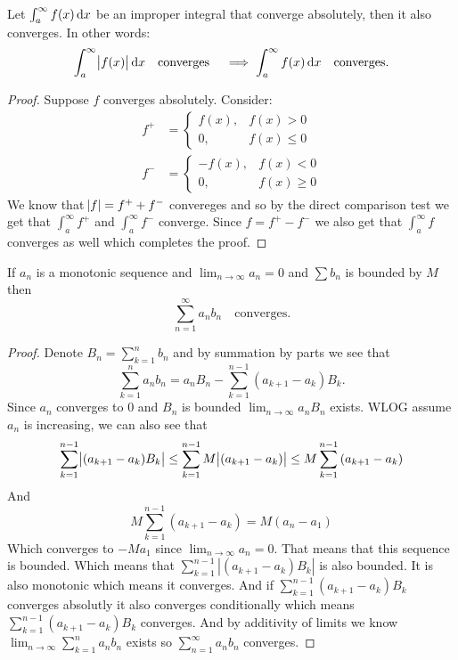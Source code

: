 \documentclass[11pt,a4paper]{article}
\begin{document}
  \begin{proposition}
    Let $\int_a^\infty f(x)\dx$ be an improper integral that 
    converge absolutely, then it also converges.
    In other words:
    \[
      \int_a^\infty \abs{f(x)}\dx \quad\mathrm{converges}\quad
      \implies
      \int_a^\infty {f(x)}\dx \quad\mathrm{converges}.
    \]
  \end{proposition}
  \begin{proof}
    Suppose $f$ converges absolutely. Consider:
    \begin{align*}
      f^+&=
      \begin{cases}
          f(x),  & f(x) > 0 \\
          0,  & f(x) \le 0
      \end{cases} \\
      f^-&=
      \begin{cases}
          -f(x),  & f(x) < 0 \\
          0,  & f(x) \ge 0
      \end{cases}
    \end{align*}
    We know that $\abs{f} = f^+ + f^-$ convereges and so by the direct 
    comparison test we get that  $\int_{a}^{\infty} f^+$ and 
    $\int_{a}^{\infty} f^-$ converge.
    Since $f = f^+ - f^-$ we also get that $\int_{a}^{\infty} f$ converges 
    as well which completes the proof.
  \end{proof}

  \begin{proposition}
    If $a_n$ is a monotonic sequence and $\lim_{n\to\infty} a_n = 0$ and 
    $\sum b_n$ is bounded by $M$ then
    \[
      \sum_{n=1}^{\infty} a_n b_n \quad\mathrm{ converges}.
    \]
  \end{proposition}
  \begin{proof}
		Denote $B_{n} = \sum_{k=1}^{n}{b_{n}}$ and by summation by parts we see that
		\[
			\sum_{k=1}^{n}{a_{n}b_{n}} =
      a_{n}B_{n} - \sum_{k=1}^{n-1}{(a_{k+1}-a_{k})B_k}.
		\]
		Since $a_{n}$ converges to $0$ and $B_{n}$ is bounded 
		$\lim_{n\to\infty}{a_nB_n}$ exists.
		WLOG assume $a_n$ is increasing, we can also see that
		\[
    \sum_{k=1}^{n-1} \abs{(a_{k+1}-a_{k})B_k} \le
    \sum_{k=1}^{n-1} M\abs{(a_{k+1}-a_{k})} \le
			M \sum_{k=1}^{n-1}{(a_{k+1}-a_{k})}
		\] 
		And
		\[
			M \sum_{k=1}^{n-1}{(a_{k+1}-a_{k})} = M(a_{n}-a_{1})
		\]
		Which converges to $-Ma_1$ since $\lim_{n\to\infty}{a_n}=0$.
		That means that this sequence is bounded. Which means that
		$\sum_{k=1}^{n-1}{|(a_{k+1}-a_{k})B_k|}$ is also bounded.
		It is also monotonic which means it converges. And if
		$\sum_{k=1}^{n-1}{(a_{k+1}-a_{k})B_k}$ converges absolutly it also
		converges conditionally which means $\sum_{k=1}^{n-1}{(a_{k+1}-a_{k})B_k}$
		converges. And by additivity of limits we know 
		$\lim_{n\to\infty}\sum_{k=1}^{n}{a_{n}b_{n}}$ exists so 
		$\sum_{n=1}^\infty a_nb_n$ converges.
  \end{proof}
	
\end{document}

